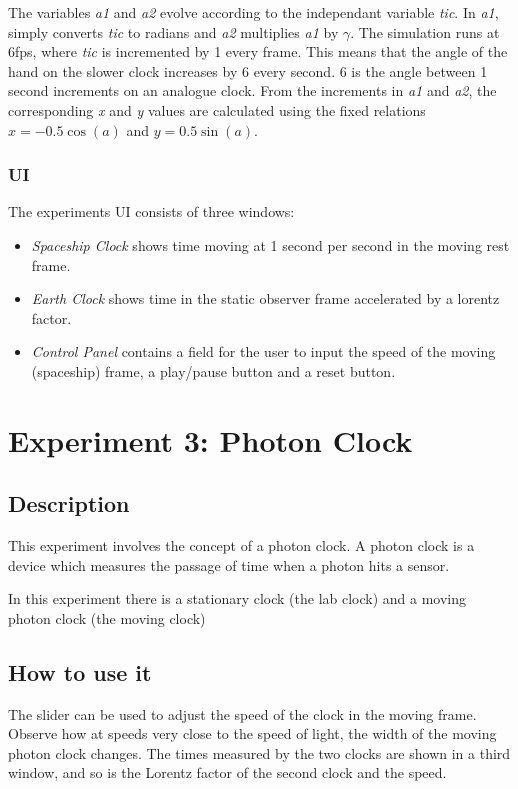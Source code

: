 The variables \emph{a1} and \emph{a2} evolve according to the independant variable \emph{tic}. In \emph{a1}, simply converts \emph{tic} to radians and \emph{a2} multiplies \emph{a1} by $\gamma$.
The simulation runs at 6fps, where \emph{tic} is incremented by 1 every frame. This means that the angle of the hand on the slower clock increases by 6\textdegree{} every second. 6\textdegree{} is the angle between 1 second increments on an analogue clock.
From the increments in \emph{a1} and \emph{a2}, the corresponding \emph{x} and \emph{y} values are calculated using the fixed relations $x = -0.5\cos(a)$ and $y = 0.5\sin(a)$.
\subsubsection*{UI}
\label{sec-2-2-3}

The experiments UI consists of three windows:
\begin{itemize}
\item \emph{Spaceship Clock} shows time moving at 1 second per second in the moving rest frame.
\item \emph{Earth Clock} shows time in the static observer frame accelerated by a lorentz factor.
\item \emph{Control Panel} contains a field for the user to input the speed of the moving (spaceship) frame, a play/pause button and a reset button.
\end{itemize}
\section*{Experiment 3: Photon Clock}
\label{sec-3}
\subsection*{Description}
\label{sec-3-1}

This experiment involves the concept of a photon clock. A photon clock is a device which measures the passage of time when a photon hits a sensor.

In this experiment there is a stationary clock (the lab clock) and a moving photon clock (the moving clock) 
   
\subsection*{How to use it}
\label{sec-3-2}

The slider can be used to adjust the speed of the clock in the moving frame. Observe how at speeds very close to the speed of light, the width of the moving photon clock changes.
The times measured by the two clocks are shown in a third window, and so is the Lorentz factor of the second clock and the speed.

